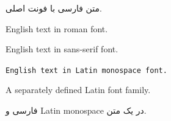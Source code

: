 \documentclass{article}
\begin{document}
    متن فارسی با فونت اصلی.


    English text in roman font.

    \textsf{English text in sans-serif font.}

    \texttt{English text in Latin monospace font.}

    {\latinfont A separately defined Latin font family.}


    فارسی و
    {\latinttfamily Latin monospace}
    در یک متن.
\end{document}
